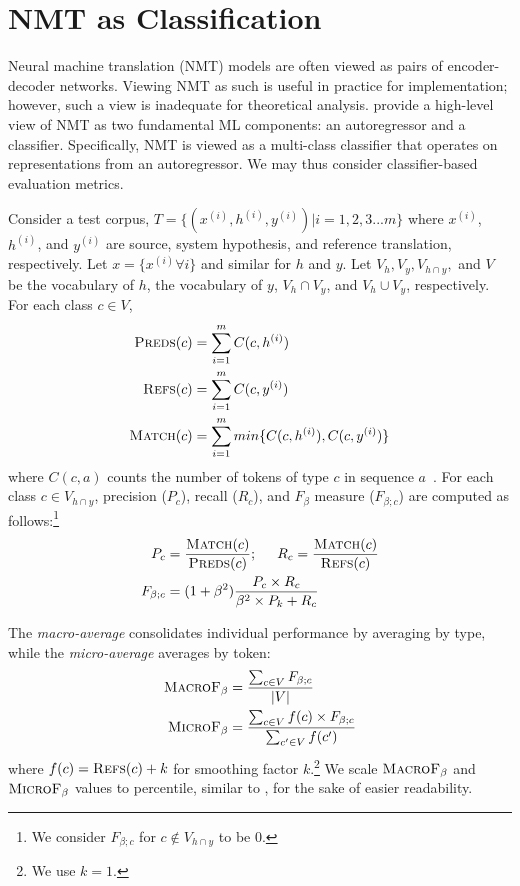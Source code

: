 \section{NMT as Classification}
\label{sec:mt-as-cls}
Neural machine translation (NMT) models are often viewed as pairs of encoder-decoder networks.
Viewing NMT as such is useful in practice for implementation; however, such a view is inadequate for theoretical analysis. %
\citet{gowda2020finding} provide a high-level view of NMT as two fundamental ML components: an autoregressor and a classifier. 
Specifically, NMT is viewed as a multi-class classifier that operates on representations from an autoregressor.
We may thus consider classifier-based evaluation metrics.


Consider a test corpus, $T = \{ (x^{(i)}, h^{(i)}, y^{(i)}) | i = 1,2,3...m \}$ where $x^{(i)}$, $h^{(i)}$, and $y^{(i)}$ are source, system hypothesis, and reference translation, respectively. Let $x = \{x^{(i)} \forall i\}$ and similar for $h$ and $y$.  Let $V_h, V_y, V_{h\cap y},$ and $V$ be the vocabulary of $h$, the vocabulary of $y$, $V_h \cap V_y$, and $V_h \cup V_y$, respectively.
For each class $c \in V$, 
\begin{align*}
 \textsc{Preds}(c) &= \sum_{i=1}^m C(c, h^{(i)})\\
 \textsc{Refs}(c) &= \sum_{i=1}^m C(c, y^{(i)})\\
\textsc{Match}(c) &= \sum_{i=1}^m min\{C(c, h^{(i)}), C(c, y^{(i)})\} 
\end{align*}
\noindent where $C(c, a)$  counts the number of tokens of type $c$ in sequence $a$~\cite{papineni-etal-2002-bleu}. 
For each class $c \in V_{h \cap y}$, precision ($P_c$), recall ($R_c$), and $F_\beta$ measure ($F_{\beta;c}$) are computed as follows:\footnote{We consider $F_{\beta;c}$ for $c \not\in V_{h \cap y}$ to be 0.}
\begin{align*}
    P_c &= \frac{\textsc{Match}(c)}{\textsc{Preds}(c)} ; \hspace{5mm} R_c = \frac{\textsc{Match}(c)}{\textsc{Refs}(c)} \\
    F_{\beta;c} &= (1 + \beta^2)  \frac{ P_c \times R_c}{ \beta^2 \times P_k + R_c}
\end{align*}

The \textit{macro-average} consolidates individual performance by averaging by type, while the  \textit{micro-average} averages by token:  
\begin{align*}
\textsc{MacroF}{\text{$_{{\beta}}$}} &= \frac{\sum_{c \in V} F_{\beta;c}} {|V|}\\
\textsc{MicroF}{\text{$_{{\beta}}$}} &= \frac{\sum_{c\in V} f(c) \times F_{\beta;c}} {\sum_{c'\in V} f(c')}
\end{align*}
\noindent where $f(c) = \textsc{Refs}(c)+k$ for smoothing factor $k$.\footnote{We use $k=1$.} We scale $\textsc{MacroF}{\text{$_{{\beta}}$}}$ and $\textsc{MicroF}{\text{$_{{\beta}}$}}$ values to percentile, similar to \bleu, for the sake of easier readability. 
